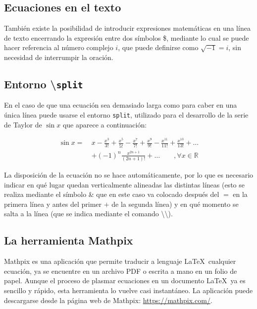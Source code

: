 \subsection{Ecuaciones en el texto}

También existe la posibilidad de introducir expresiones matemáticas en una línea de texto encerrando la expresión entre dos símbolos \$, mediante lo cual se puede hacer referencia al número complejo $i$, que puede definirse como $\sqrt{-1}=i$, sin necesidad de interrumpir la oración.


\subsection{Entorno \textbackslash\texttt{split}}

En el caso de que una ecuación sea demasiado larga como para caber en una única línea puede usarse el entorno \texttt{split}, utilizado para el desarrollo de la serie de Taylor de $\sin{x}$ que aparece a continuación:

\begin{equation}
\begin{split}
    \sin{x} = \ & x - \frac{x^3}{3!} + \frac{x^5}{5!} - \frac{x^7}{7!} + \frac{x^9}{9!} - \frac{x^{11}}{11!} + \frac{x^13}{13!} + \dots \\ & + (-1)^n \frac{x^{2n+1}}{(2n+1)!} + \dots \qquad , \forall x \in \mathbb{R}
    \label{eq:taylor}
\end{split}
\end{equation}

La disposición de la ecuación no se hace automáticamente, por lo que es necesario indicar en qué lugar quedan verticalmente alineadas las distintas líneas (esto se realiza mediante el símbolo \& que en este caso va colocado después del $=$ en la primera línea y antes del primer $+$ de la segunda línea) y en qué momento se salta a la línea (que se indica mediante el comando \textbackslash\textbackslash).


\subsection{La herramienta Mathpix}

Mathpix es una aplicación que permite traducir a lenguaje \LaTeX \ cualquier ecuación, ya se encuentre en un archivo PDF o escrita a mano en un folio de papel. Aunque el proceso de plasmar ecuaciones en un documento \LaTeX \ ya es sencillo y rápido, esta herramienta lo vuelve casi instantáneo. La aplicación puede descargarse desde la página web de Mathpix: \url{https://mathpix.com/}.

